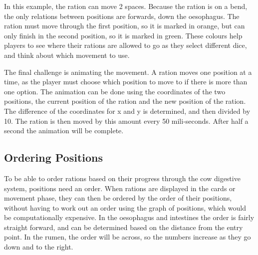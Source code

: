 In this example, the ration can move 2 spaces. Because the ration is on a bend, the only relations between positions are forwards, down the oesophagus. The ration must move through the first position, so it is marked in orange, but can only finish in the second position, so it is marked in green. These colours help players to see where their rations are allowed to go as they select different dice, and think about which movement to use.

The final challenge is animating the movement. A ration moves one position at a time, as the player must choose which position to move to if there is more than one option. The animation can be done using the coordinates of the two positions, the current position of the ration and the new position of the ration. The difference of the coordinates for x and y is determined, and then divided by 10. The ration is then moved by this amount every 50 mili-seconds. After half a second the animation will be complete.

\subsection{Ordering Positions}
To be able to order rations based on their progress through the cow digestive system, positions need an order. When rations are displayed in the cards or movement phase, they can then be ordered by the order of their positions, without having to work out an order using the graph of positions, which would be computationally expensive. In the oesophagus and intestines the order is fairly straight forward, and can be determined based on the distance from the entry point. In the rumen, the order will be across, so the numbers increase as they go down and to the right.

\begin{center}
\end{center}

